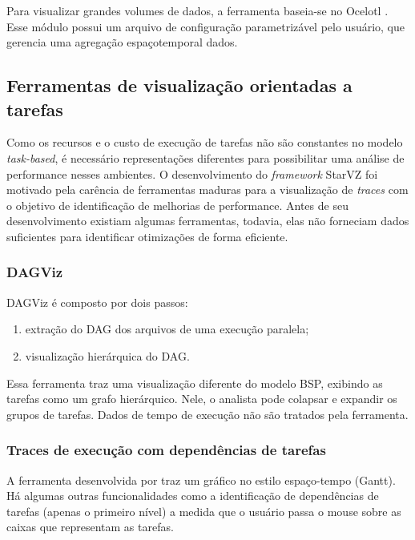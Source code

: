 Para visualizar grandes volumes de dados, a ferramenta baseia-se no Ocelotl \cite{ref:ocelotl}. Esse módulo possui um arquivo de configuração parametrizável pelo usuário, que gerencia uma agregação espaçotemporal dados.

\subsection*{Ferramentas de visualização orientadas a tarefas}

Como os recursos e o custo de execução de tarefas não são constantes no modelo \emph{task-based}, é necessário representações diferentes para
possibilitar uma análise de performance nesses ambientes. O desenvolvimento do \emph{framework} StarVZ \cite{ref:starvz} foi motivado pela carência
de ferramentas maduras para a visualização de \emph{traces} com o objetivo de identificação de melhorias de performance. Antes de seu desenvolvimento existiam algumas ferramentas, todavia, elas não forneciam dados suficientes para identificar otimizações de forma eficiente.

\subsubsection*{DAGViz}

DAGViz \cite{ref:dagviz} é composto por dois passos: 

\begin{enumerate}
    \item extração do DAG dos arquivos de uma execução paralela;
    \item visualização hierárquica do DAG.
\end{enumerate}

Essa ferramenta traz uma visualização diferente do modelo BSP, exibindo as tarefas como um grafo hierárquico. Nele, o analista pode colapsar e expandir os grupos de tarefas. Dados de tempo de execução não são tratados pela ferramenta.

\subsubsection*{Traces de execução com dependências de tarefas}

A ferramenta desenvolvida por \citet{ref:visuexecdep} traz um gráfico no estilo espaço-tempo (Gantt). Há algumas outras funcionalidades como a identificação de dependências de tarefas (apenas o primeiro nível) a medida que o usuário passa o mouse sobre as caixas que representam as tarefas.

